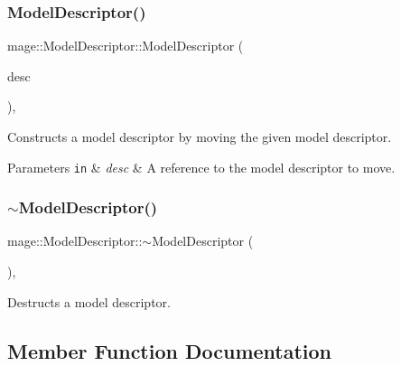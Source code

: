 \subsubsection{\texorpdfstring{Model\+Descriptor()}{ModelDescriptor()}\hspace{0.1cm}{\footnotesize\ttfamily [4/4]}}
{\footnotesize\ttfamily mage\+::\+Model\+Descriptor\+::\+Model\+Descriptor (\begin{DoxyParamCaption}\item[{\hyperlink{classmage_1_1_model_descriptor}{Model\+Descriptor} \&\&}]{desc }\end{DoxyParamCaption})\hspace{0.3cm}{\ttfamily [default]}, {\ttfamily [noexcept]}}

Constructs a model descriptor by moving the given model descriptor.


\begin{DoxyParams}[1]{Parameters}
\mbox{\tt in}  & {\em desc} & A reference to the model descriptor to move. \\
\hline
\end{DoxyParams}
\hypertarget{classmage_1_1_model_descriptor_aae13cf050ee7f9283d91282c04f62df1}{}\label{classmage_1_1_model_descriptor_aae13cf050ee7f9283d91282c04f62df1} 
\subsubsection{\texorpdfstring{$\sim$\+Model\+Descriptor()}{~ModelDescriptor()}}
{\footnotesize\ttfamily mage\+::\+Model\+Descriptor\+::$\sim$\+Model\+Descriptor (\begin{DoxyParamCaption}{ }\end{DoxyParamCaption})\hspace{0.3cm}{\ttfamily [virtual]}, {\ttfamily [default]}}

Destructs a model descriptor. 

\subsection{Member Function Documentation}
\hypertarget{classmage_1_1_model_descriptor_ac4723e18238b0d6ac3c54168b8e9a09f}{}\label{classmage_1_1_model_descriptor_ac4723e18238b0d6ac3c54168b8e9a09f} 
